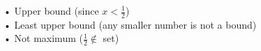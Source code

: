 \documentclass[preview]{standalone}
\begin{document}
\begin{center}
• Upper bound (since $x < \frac{1}{2}$)\\• Least upper bound (any smaller number is not a bound)\\• Not maximum ($\frac{1}{2} \notin$ set)
\end{center}
\end{document}
